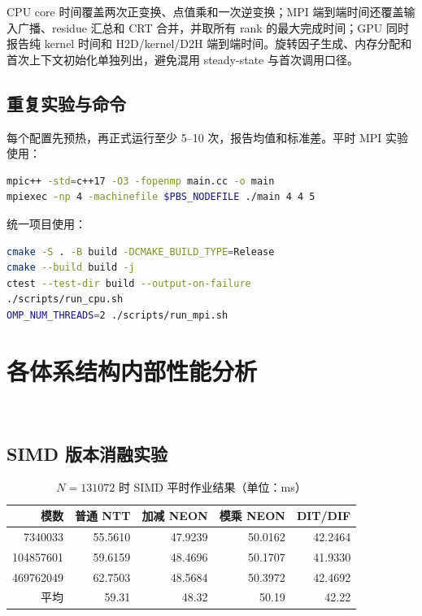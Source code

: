 CPU core 时间覆盖两次正变换、点值乘和一次逆变换；MPI 端到端时间还覆盖输入广播、residue 汇总和 CRT 合并，并取所有 rank 的最大完成时间；GPU 同时报告纯 kernel 时间和 H2D/kernel/D2H 端到端时间。旋转因子生成、内存分配和首次上下文初始化单独列出，避免混用 steady-state 与首次调用口径。

\subsection{重复实验与命令}

每个配置先预热，再正式运行至少 5--10 次，报告均值和标准差。平时 MPI 实验使用：

\begin{lstlisting}[title=MPI实验编译和运行命令,language=bash]
mpic++ -std=c++17 -O3 -fopenmp main.cc -o main
mpiexec -np 4 -machinefile $PBS_NODEFILE ./main 4 4 5
\end{lstlisting}

统一项目使用：

\begin{lstlisting}[title=统一复测命令,language=bash]
cmake -S . -B build -DCMAKE_BUILD_TYPE=Release
cmake --build build -j
ctest --test-dir build --output-on-failure
./scripts/run_cpu.sh
OMP_NUM_THREADS=2 ./scripts/run_mpi.sh
\end{lstlisting}


\section{各体系结构内部性能分析}\oldwork\ \fusionwork

\subsection{SIMD 版本消融实验}

\begin{table}[H]
  \centering
  \caption{$N=131072$ 时 SIMD 平时作业结果（单位：ms）}
  \label{tab:simd-result}
  \begin{tabular}{r r r r r}
    \toprule
    模数 & 普通 NTT & 加减 NEON & 模乘 NEON & DIT/DIF \\
    \midrule
    7340033 & 55.5610 & 47.9239 & 50.0162 & 42.2464 \\
    104857601 & 59.6159 & 48.4696 & 50.1707 & 41.9330 \\
    469762049 & 62.7503 & 48.5684 & 50.3972 & 42.4692 \\
    \midrule
    平均 & 59.31 & 48.32 & 50.19 & 42.22 \\
    \bottomrule
  \end{tabular}
\end{table}

